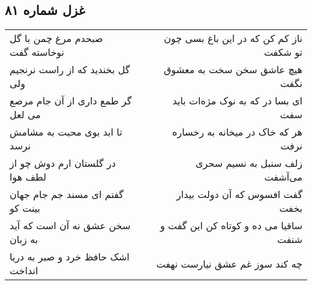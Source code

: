 \begin{center}
\section*{غزل شماره ۸۱}
\label{sec:sh081}
\begin{longtable}{l p{0.5cm} r}
صبحدم مرغ چمن با گل نوخاسته گفت
&&
ناز کم کن که در این باغ بسی چون تو شکفت
\\
گل بخندید که از راست نرنجیم ولی
&&
هیچ عاشق سخن سخت به معشوق نگفت
\\
گر طمع داری از آن جام مرصع می لعل
&&
ای بسا در که به نوک مژه‌ات باید سفت
\\
تا ابد بوی محبت به مشامش نرسد
&&
هر که خاک در میخانه به رخساره نرفت
\\
در گلستان ارم دوش چو از لطف هوا
&&
زلف سنبل به نسیم سحری می‌آشفت
\\
گفتم ای مسند جم جام جهان بینت کو
&&
گفت افسوس که آن دولت بیدار بخفت
\\
سخن عشق نه آن است که آید به زبان
&&
ساقیا می ده و کوتاه کن این گفت و شنفت
\\
اشک حافظ خرد و صبر به دریا انداخت
&&
چه کند سوز غم عشق نیارست نهفت
\\
\end{longtable}
\end{center}

